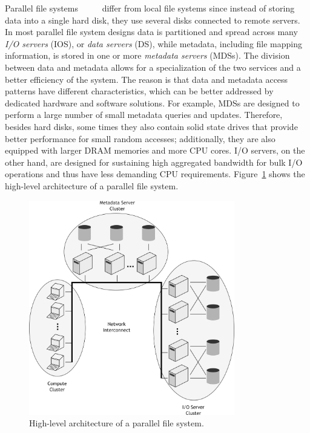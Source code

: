 Parallel file systems~\cite{Braam02}~\cite{SchmuckH02}~\cite{Welch2008}~\cite{CarnsLRT}~\cite{Heichler2014} differ from local file systems since instead of storing data into a single hard disk, they use several disks 
connected to remote servers. In most parallel file system designs data is partitioned and spread across many \textit{I/O servers} (IOS), or \textit{data servers} (DS), while metadata, including file mapping information, 
is stored in one or more \textit{metadata servers} (MDSs). The division between data and metadata allows for a specialization of the two services and a better efficiency of the system. The reason is that data and metadata 
access patterns have different characteristics, which can be better addressed by dedicated hardware and software solutions. For example, MDSs are designed to perform a large number of small metadata queries and updates. 
Therefore, besides hard disks, some times they also contain solid state drives that provide better performance for small random accesses; additionally, they are also equipped with larger DRAM memories and more CPU cores. 
I/O servers, on the other hand, are designed for sustaining high aggregated bandwidth for bulk I/O operations and thus have less demanding CPU requirements. Figure~\ref{figure: pfs} shows the high-level architecture of a 
parallel file system.

\begin{figure}[!htb]
\centering
\includegraphics[width=0.8\textwidth]{figures/pfs}
\caption{High-level architecture of a parallel file system.}
\label{figure: pfs}
\end{figure}

